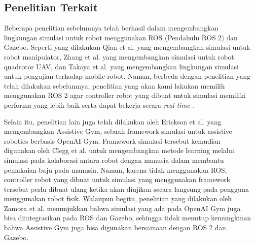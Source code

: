 \subsection{Penelitian Terkait}

Beberapa penelitian sebelumnya telah berhasil dalam mengembangkan lingkungan simulasi untuk robot menggunakan ROS (Pendahulu ROS 2) dan Gazebo.
Seperti yang dilakukan Qian et al. \citep{Qian2014} yang mengembangkan simulasi untuk robot manipulator, Zhang et al. \citep{Zhang2015} yang mengembangkan simulasi untuk robot quadrotor UAV, dan Takaya et al. \citep{Takaya2016} yang mengembangkan lingkungan simulasi untuk pengujian terhadap mobile robot.
Namun, berbeda dengan penelitian yang telah dilakukan sebelumnya, penelitian yang akan kami lakukan memilih menggunakan ROS 2 agar controller robot yang dibuat untuk simulasi memiliki performa yang lebih baik serta dapat bekerja secara \emph{real-time} \citep{Maruyama2016}.

Selain itu, penelitian lain juga telah dilakukan oleh Erickson et al. \citep{Erickson2020} yang mengembangkan Assistive Gym, sebuah framework simulasi untuk assistive robotics berbasis OpenAI Gym.
Framework simulasi tersebut kemudian digunakan oleh Clegg et al. \citep{Clegg2020} untuk mengembangkan metode learning melalui simulasi pada kolaborasi antara robot dengan manusia dalam membantu pemakaian baju pada manusia.
Namun, karena tidak menggunakan ROS, controller robot yang dibuat untuk simulasi yang menggunakan framework tersebut perlu dibuat ulang ketika akan diujikan secara langsung pada pengguna menggunakan robot fisik.
Walaupun begitu, penelitian yang dilakukan oleh Zamora et al. \citep{Zamora2016} menunjukkan bahwa simulasi yang ada pada OpenAI Gym juga bisa diintegrasikan pada ROS dan Gazebo, sehingga tidak menutup kemungkinan bahwa Assistive Gym juga bisa digunakan bersamaan dengan ROS 2 dan Gazebo.
